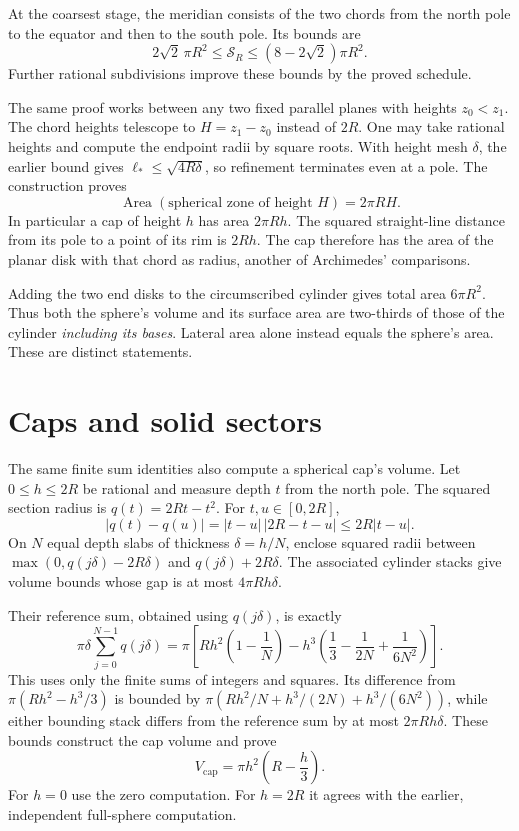 At the coarsest stage, the meridian consists of the two chords from the
north pole to the equator and then to the south pole.  Its bounds are
\[
 2\sqrt2\,\pi R^2\le\mathcal S_R
       \le(8-2\sqrt2)\pi R^2.
\]
Further rational subdivisions improve these bounds by the proved schedule.

The same proof works between any two fixed parallel planes with heights
$z_0<z_1$.  The chord heights telescope to $H=z_1-z_0$ instead of $2R$.
One may take rational heights and compute the endpoint radii by square
roots.  With height mesh $\delta$, the earlier bound gives
$\ell_*\le\sqrt{4R\delta}$, so refinement terminates even at a pole.
The construction proves
\[
 \boxed{\operatorname{Area}(\text{spherical zone of height }H)
                  =2\pi RH.}
\]
In particular a cap of height $h$ has area $2\pi Rh$.  The squared
straight-line distance from its pole to a point of its rim is $2Rh$.
The cap therefore has the area of the planar disk with that chord as
radius, another of Archimedes' comparisons.

Adding the two end disks to the circumscribed cylinder gives total area
$6\pi R^2$.  Thus both the sphere's volume and its surface area are
two-thirds of those of the cylinder \emph{including its bases}.  Lateral
area alone instead equals the sphere's area.  These are distinct statements.

\section{Caps and solid sectors}
\label{sec:spherical-caps-sectors}
The same finite sum identities also compute a spherical cap's volume.
Let $0\le h\le2R$ be rational and measure depth $t$ from the north pole.
The squared section radius is $q(t)=2Rt-t^2$.  For $t,u\in[0,2R]$,
\[
 |q(t)-q(u)|=|t-u|\,|2R-t-u|\le2R|t-u|.
\]
On $N$ equal depth slabs of thickness $\delta=h/N$, enclose squared
radii between $\max(0,q(j\delta)-2R\delta)$ and
$q(j\delta)+2R\delta$.  The associated cylinder stacks give volume
bounds whose gap is at most $4\pi R h\delta$.

Their reference sum, obtained using $q(j\delta)$, is exactly
\[
 \pi\delta\sum_{j=0}^{N-1}q(j\delta)
 =\pi\left[R h^2\left(1-\frac1N\right)
   -h^3\left(\frac13-\frac1{2N}+\frac1{6N^2}\right)\right].
\]
This uses only the finite sums of integers and squares.  Its difference
from $\pi(Rh^2-h^3/3)$ is bounded by
$\pi(Rh^2/N+h^3/(2N)+h^3/(6N^2))$, while either bounding stack differs
from the reference sum by at most $2\pi R h\delta$.  These bounds
construct the cap volume and prove
\[
 \boxed{V_{\mathrm{cap}}=\pi h^2\left(R-\frac h3\right).}
\]
For $h=0$ use the zero computation.  For $h=2R$ it agrees with the earlier,
independent full-sphere computation.

